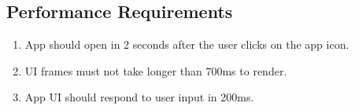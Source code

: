 \documentclass[../report.tex]{subfiles}
\begin{document}
\subsection{Performance Requirements\cite{app-vitals}}
\begin{enumerate}
\item App should open in 2 seconds after the user clicks on the app icon.
\item UI frames must not take longer than 700ms to render.
\item App UI should respond to user input in 200ms.
\end{enumerate}
\end{document}
